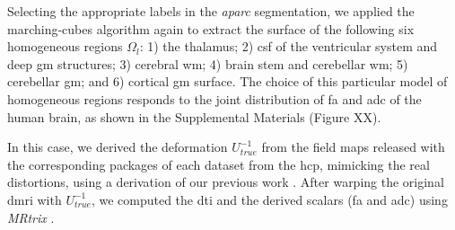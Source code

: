 Selecting the appropriate labels in the \emph{aparc} segmentation, we applied
  the marching-cubes algorithm again to extract the surface of the following
  six homogeneous regions $\Omega_l$:
  1) the thalamus;
  2) \gls*{csf} of the ventricular system and deep \gls*{gm} structures;
  3) cerebral \gls*{wm};
  4) brain stem and cerebellar \gls*{wm};
	5) cerebellar \gls*{gm}; and
	6) cortical \gls*{gm} surface.
The choice of this particular model of homogeneous regions responds to the joint distribution
  of \gls*{fa} and \gls*{adc} of the human brain, as shown in the {\color{red} Supplemental
  Materials (Figure XX)}.

In this case, we derived the deformation $U_{true}^{-1}$ from the field maps released with
  the corresponding packages of each dataset from the \gls*{hcp},
  mimicking the real distortions, using a derivation of our previous work
  \citep{esteban_simulationbased_2014}.
After warping the original \gls*{dmri} with $U_{true}^{-1}$, we computed the \gls*{dti} and
  the derived scalars (\gls*{fa} and \gls*{adc}) using \emph{MRtrix} \citep{tournier_mrtrix_2012}.